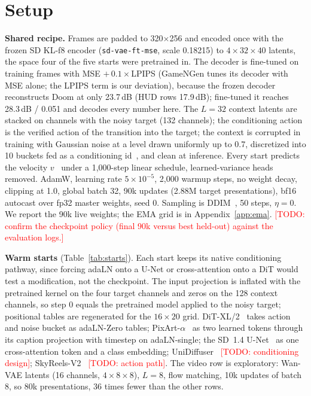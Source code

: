 \documentclass[10pt]{article}
\newcommand{\todo}[1]{\textcolor{red}{[TODO: #1]}}
\begin{document}
\section{Setup}
\label{sec:setup}
\textbf{Shared recipe.} Frames are padded to 320$\times$256 and encoded once with the frozen SD KL-f8 encoder (\texttt{sd-vae-ft-mse}, scale 0.18215) to $4\times32\times40$ latents, the space four of the five starts were pretrained in. The decoder is fine-tuned on training frames with MSE $+\,0.1\times$LPIPS (GameNGen tunes its decoder with MSE alone; the LPIPS term is our deviation), because the frozen decoder reconstructs Doom at only 23.7\,dB (HUD rows 17.9\,dB); fine-tuned it reaches 28.3\,dB / 0.051 and decodes every number here. The $L{=}32$ context latents are stacked on channels with the noisy target (132 channels); the conditioning action is the verified action of the transition into the target; the context is corrupted in training with Gaussian noise at a level drawn uniformly up to 0.7, discretized into 10 buckets fed as a conditioning id~\citep{valevski2024gamengen}, and clean at inference. Every start predicts the velocity $v$~\citep{salimans2022progressive} under a 1,000-step linear schedule, learned-variance heads removed. AdamW, learning rate $5\times10^{-5}$, 2,000 warmup steps, no weight decay, clipping at 1.0, global batch 32, 90k updates (2.88M target presentations), bf16 autocast over fp32 master weights, seed 0. Sampling is DDIM~\citep{song2021ddim}, 50 steps, $\eta{=}0$. We report the 90k live weights; the EMA grid is in Appendix~\ref{app:ema}. \todo{confirm the checkpoint policy (final 90k versus best held-out) against the evaluation logs.}

\textbf{Warm starts} (Table~\ref{tab:starts}). Each start keeps its native conditioning pathway, since forcing adaLN onto a U-Net or cross-attention onto a DiT would test a modification, not the checkpoint. The input projection is inflated with the pretrained kernel on the four target channels and zeros on the 128 context channels, so step 0 equals the pretrained model applied to the noisy target; positional tables are regenerated for the $16\times20$ grid. DiT-XL/2~\citep{peebles2023dit} takes action and noise bucket as adaLN-Zero tables; PixArt-$\alpha$~\citep{chen2023pixart} as two learned tokens through its caption projection with timestep on adaLN-single; the SD~1.4 U-Net~\citep{rombach2022ldm} as one cross-attention token and a class embedding; UniDiffuser~\citep{bao2023unidiffuser} \todo{conditioning design}; SkyReels-V2~\citep{chen2025skyreels} \todo{action path}. The video row is exploratory: Wan-VAE latents (16 channels, $4\times8\times8$), $L{=}8$, flow matching, 10k updates of batch 8, so 80k presentations, 36 times fewer than the other rows.
\end{document}
